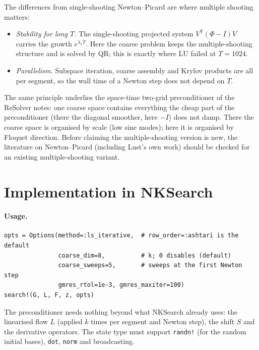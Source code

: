 \documentclass[11pt,a4paper]{article}
\newcommand{\tr}{^{\mathsf T}}
\begin{document}
The differences from single-shooting Newton--Picard are where multiple shooting matters:
\begin{itemize}
\item \emph{Stability for long $T$.} The single-shooting projected system $V\tr(\Phi - I)V$ carries the growth $e^{\lambda_1 T}$. Here the coarse problem keeps the multiple-shooting structure and is solved by QR; this is exactly where LU failed at $T = 1024$.
\item \emph{Parallelism.} Subspace iteration, coarse assembly and Krylov products are all per segment, so the wall time of a Newton step does not depend on $T$.
\end{itemize}

The same principle underlies the space-time two-grid preconditioner of the ReSolver notes: one coarse space contains everything the cheap part of the preconditioner (there the diagonal smoother, here $-I$) does not damp. There the coarse space is organised by scale (low sine modes); here it is organised by Floquet direction. Before claiming the multiple-shooting version is new, the literature on Newton--Picard (including Lust's own work) should be checked for an existing multiple-shooting variant.

\section{Implementation in NKSearch}

\paragraph{Usage.}
\begin{verbatim}
opts = Options(method=:ls_iterative,  # row_order=:ashtari is the default
               coarse_dim=8,          # k; 0 disables (default)
               coarse_sweeps=5,       # sweeps at the first Newton step
               gmres_rtol=1e-3, gmres_maxiter=100)
search!(G, L, F, z, opts)
\end{verbatim}
The preconditioner needs nothing beyond what NKSearch already uses: the linearised flow $L$ (applied $k$ times per segment and Newton step), the shift $S$ and the derivative operators. The state type must support \texttt{randn!} (for the random initial bases), \texttt{dot}, \texttt{norm} and broadcasting.
\end{document}
